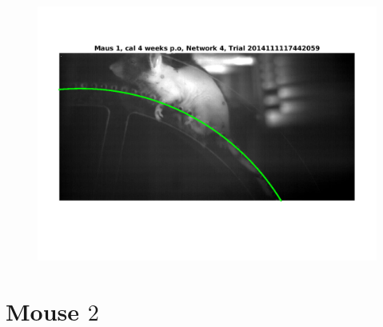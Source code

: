 \documentclass[
	fontsize=12pt,
	paper=a4,
	twoside=false,
	numbers=noenddot,
	plainheadsepline,
	toc=listof,
	toc=bibliography
]{scrartcl}
\begin{document}
\begin{figure} [htb] \centering
	\includegraphics[scale = 0.6]{images/mouse1/result_Maus_1_cal_4_weeks_Network_4.png}
\end{figure}

\FloatBarrier

\section*{Mouse $2$}
\end{document}
